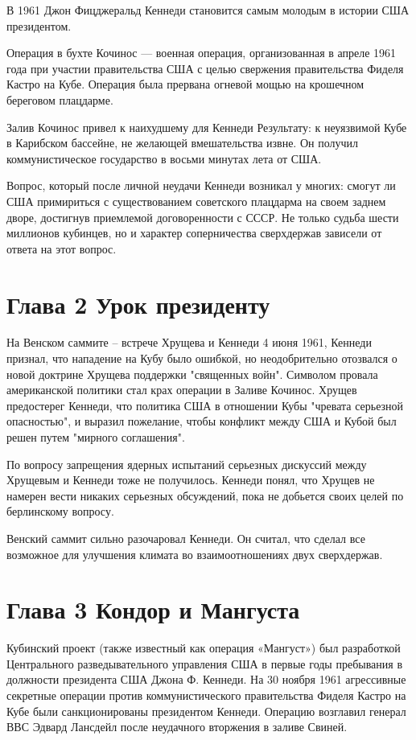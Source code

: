 \documentclass[14pt]{extreport}
\begin{document}
В 1961 Джон Фицджеральд Кеннеди становится самым молодым в истории США президентом.

Операция в бухте Кочинос — военная операция, организованная в апреле 1961 года при участии правительства США с целью свержения правительства Фиделя Кастро на Кубе. Операция была прервана огневой мощью на крошечном береговом плацдарме.

Залив Кочинос привел к наихудшему для Кеннеди Результату: к неуязвимой Кубе в Карибском бассейне, не желающей вмешательства извне. Он получил коммунистическое государство в восьми минутах лета от США.

Вопрос, который после личной неудачи Кеннеди возникал у многих: смогут ли США примириться с существованием советского плацдарма на своем заднем дворе, достигнув приемлемой договоренности с СССР. Не только судьба шести миллионов кубинцев, но и характер соперничества сверхдержав зависели от ответа на этот вопрос.


\section{Глава 2 Урок президенту}

На Венском саммите – встрече Хрущева и Кеннеди 4 июня 1961, Кеннеди признал, что нападение на Кубу было ошибкой, но неодобрительно отозвался о новой доктрине Хрущева поддержки "священных войн". Символом провала американской политики стал крах операции в Заливе Кочинос. Хрущев предостерег Кеннеди, что политика США в отношении Кубы "чревата серьезной опасностью", и выразил пожелание, чтобы конфликт между США и Кубой был решен путем "мирного соглашения".

По вопросу запрещения ядерных испытаний серьезных дискуссий между Хрущевым и Кеннеди тоже не получилось. Кеннеди понял, что Хрущев не намерен вести никаких серьезных обсуждений, пока не добьется своих целей по берлинскому вопросу.

Венский саммит сильно разочаровал Кеннеди. Он считал, что сделал все возможное для улучшения климата во взаимоотношениях двух сверхдержав.


\section{Глава 3 Кондор и Мангуста}

Кубинский проект (также известный как операция «Мангуст») был разработкой Центрального разведывательного управления США в первые годы пребывания в должности президента США Джона Ф. Кеннеди. На 30 ноября 1961 агрессивные секретные операции против коммунистического правительства Фиделя Кастро на Кубе были санкционированы президентом Кеннеди. Операцию возглавил генерал ВВС Эдвард Лансдейл после неудачного вторжения в заливе Свиней.
\end{document}
